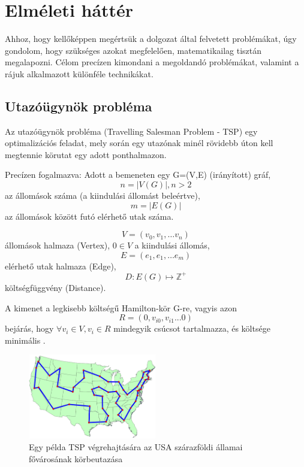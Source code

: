 \chapter{Elméleti háttér} \label{theoryChapter}

Ahhoz, hogy kellőképpen megértsük a dolgozat által felvetett problémákat, úgy gondolom, hogy szükséges azokat megfelelően, matematikailag tisztán megalapozni. Célom precízen kimondani a megoldandó problémákat, valamint a rájuk alkalmazott különféle technikákat.

\section{Utazóügynök probléma \label{TSPsection}}

Az utazóügynök probléma (Travelling Salesman Problem - TSP)  egy optimalizációs feladat, mely során egy utazónak minél rövidebb úton kell megtennie körutat egy adott ponthalmazon. 

Precízen fogalmazva: Adott a bemeneten egy G=(V,E) (irányított) gráf, \[n = |V(G)|, n > 2 \] az állomások száma (a kiindulási állomást beleértve),  \[m = |E(G)| \] az állomások között futó elérhető utak száma.

\[ V = (v_0,v_1, \dots v_n )\]  állomások halmaza (Vertex), \(0 \in V\) a kiindulási állomás,
\[ E = (e_1,e_1, \dots e_m)\] elérhető utak halmaza (Edge),
\[ D : E(G) \mapsto \mathbb{Z}^+\] költségfüggvény (Distance).

A kimenet a legkisebb költségű Hamilton-kör G-re, vagyis azon 
\[ R = (0, v_{i0}, v_{i1} ... 0) \]
bejárás, hogy \( \forall v_i \in V, v_i \in R \) mindegyik csúcsot tartalmazza, és költsége minimális \cite{alg_optim}.

\begin{figure}[ht!]
	\centering
	\includegraphics[width=0.5\textwidth]{figures/tsp-usacities.png}
	\caption{Egy példa TSP végrehajtására az USA szárazföldi államai fővárosának körbeutazása \label{TSPpelda} \cite{TSPimage} }
\end{figure}

